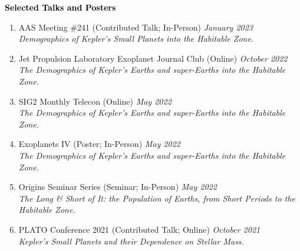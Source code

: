 \documentclass{resume} %
\newcommand{\mystrut}{\rule[-.3\baselineskip]{0pt}{\baselineskip}}
\renewenvironment{rSection}[1]{\mystrut{\textcolor{black}{{\large{\textbf{#1}}}}}
\vspace{-5pt} %
\begin{list}{}{
\setlength{\leftmargin}{0em}
}
\item[]
}{
\end{list}
}
\begin{document}
\begin{rSection}{Selected Talks and Posters} \itemsep -2pt
\begin{enumerate}


\item{AAS Meeting \#241 (Contributed Talk; In-Person)} \hfill {\em January 2023} \\
\textit{Demographics of Kepler's Small Planets into the Habitable Zone.}

\item{Jet Propulsion Laboratory Exoplanet Journal Club (Online)} \hfill {\em October 2022} \\
\textit{The Demographics of Kepler's Earths and super-Earths into the Habitable Zone.}

\item{SIG2 Monthly Telecon (Online)} \hfill {\em May 2022} \\
\textit{The Demographics of Kepler's Earths and super-Earths into the Habitable Zone.}

\item{Exoplanets IV (Poster; In-Person)} \hfill {\em May 2022} \\
\textit{The Demographics of Kepler's Earths and super-Earths into the Habitable Zone.}

\item{Origins Seminar Series (Seminar; In-Person)} \hfill {\em May 2022} \\
\textit{The Long \& Short of It: the Population of Earths, from Short Periods to the Habitable Zone.}


\item{PLATO Conference 2021 (Contributed Talk; Online)} \hfill {\em October 2021} \\
\textit{Kepler’s Small Planets and their Dependence on Stellar Mass.}


\end{enumerate}
\end{rSection}
\end{document}
